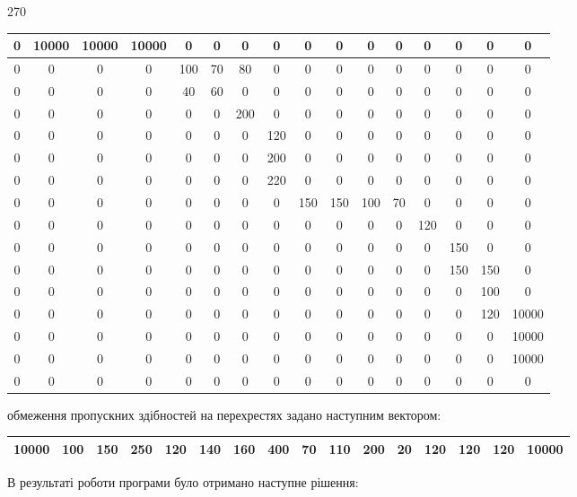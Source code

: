 \documentclass[a4paper,14pt,russian,ukrainian,oneside,final]{extreport}
\begin{document}
\begin{center}
\begin{turn}{270}
\begin{tabular}{|c|c|c|c|c|c|c|c|c|c|c|c|c|c|c|c|}
\hline
0&10000&10000&10000&0&0&0&0&0&0&0&0&0&0&0&0 \\ \hline
0&0&0&0&100&70&80&0&0&0&0&0&0&0&0&0 \\ \hline
0&0&0&0&40&60&0&0&0&0&0&0&0&0&0&0 \\ \hline
0&0&0&0&0&0&200&0&0&0&0&0&0&0&0&0 \\ \hline
0&0&0&0&0&0&0&120&0&0&0&0&0&0&0&0 \\ \hline
0&0&0&0&0&0&0&200&0&0&0&0&0&0&0&0 \\ \hline
0&0&0&0&0&0&0&220&0&0&0&0&0&0&0&0 \\ \hline
0&0&0&0&0&0&0&0&150&150&100&70&0&0&0&0 \\ \hline
0&0&0&0&0&0&0&0&0&0&0&0&120&0&0&0 \\ \hline
0&0&0&0&0&0&0&0&0&0&0&0&0&150&0&0 \\ \hline
0&0&0&0&0&0&0&0&0&0&0&0&0&150&150&0 \\ \hline
0&0&0&0&0&0&0&0&0&0&0&0&0&0&100&0 \\ \hline
0&0&0&0&0&0&0&0&0&0&0&0&0&0&120&10000 \\ \hline
0&0&0&0&0&0&0&0&0&0&0&0&0&0&0&10000 \\ \hline
0&0&0&0&0&0&0&0&0&0&0&0&0&0&0&10000 \\ \hline
0&0&0&0&0&0&0&0&0&0&0&0&0&0&0&0 \\
\hline
\end{tabular}
\end{turn}
\end{center}
обмеження пропускних здібностей на перехрестях задано наступним вектором:
\begin{center}
\begin{tabular}{|c|c|c|c|c|c|c|c|c|c|c|c|c|c|c|c|}
\hline
10000&100&150&250&120&140&160&400&70&110&200&20&120&120&120&10000 \\
\hline
\end{tabular}
\end{center}
\indent В результаті роботи програми було отримано наступне рішення:
\end{document}
